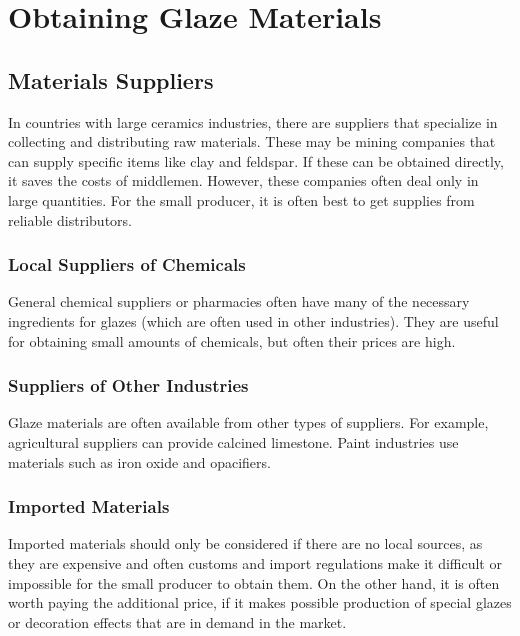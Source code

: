 \chapter{Obtaining Glaze Materials}
\section{Materials Suppliers}
In countries with large ceramics industries, there are suppliers that 
specialize in collecting and distributing raw materials. These may be mining 
companies that can supply specific items like clay and feldspar. If these can 
be obtained directly, it saves the costs of middlemen. However, these companies 
often deal only in large quantities. For the small producer, it is often best 
to get supplies from reliable distributors.
\subsection{Local Suppliers of Chemicals}
General chemical suppliers or pharmacies often have many of the necessary 
ingredients for glazes (which are often used in other industries). They are 
useful for obtaining small amounts of chemicals, but often their prices are 
high.
\subsection{Suppliers of Other Industries}
Glaze materials are often available from other types of suppliers. For example, 
agricultural suppliers can provide calcined limestone. Paint industries use 
materials such as iron oxide and opacifiers.
\subsection{Imported Materials}
Imported materials should only be considered if there are no local sources, as 
they are expensive and often customs and import regulations make it difficult 
or impossible for the small producer to obtain them. On the other hand, it is 
often worth paying the additional price, if it makes possible production of 
special glazes or decoration effects that are in demand in the market.

